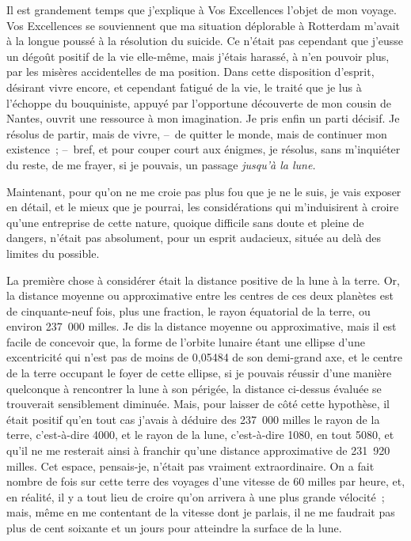 \documentclass[french,twoside]{book} %
\begin{document}
Il est grandement temps que j’explique à Vos Excellences l’objet de mon voyage. Vos Excellences se souviennent que ma situation déplorable à Rotterdam m’avait à la longue poussé à la résolution du suicide. Ce n’était pas cependant que j’eusse un dégoût positif de la vie elle-même, mais j’étais harassé, à n’en pouvoir plus, par les misères accidentelles de ma position. Dans cette disposition d’esprit, désirant vivre encore, et cependant fatigué de la vie, le traité que je lus à l’échoppe du bouquiniste, appuyé par l’opportune découverte de mon cousin de Nantes, ouvrit une ressource à mon imagination. Je pris enfin un parti décisif. Je résolus de partir, mais de vivre, – de quitter le monde, mais de continuer mon existence ; – bref, et pour couper court aux énigmes, je résolus, sans m’inquiéter du reste, de me frayer, si je pouvais, un passage \emph{jusqu’à la lune.}\par
Maintenant, pour qu’on ne me croie pas plus fou que je ne le suis, je vais exposer en détail, et le mieux que je pourrai, les considérations qui m’induisirent à croire qu’une entreprise de cette nature, quoique difficile sans doute et pleine de dangers, n’était pas absolument, pour un esprit audacieux, située au delà des limites du possible.\par
La première chose à considérer était la distance positive de la lune à la terre. Or, la distance moyenne ou approximative entre les centres de ces deux planètes est de cinquante-neuf fois, plus une fraction, le rayon équatorial de la terre, ou environ 237 000 milles. Je dis la distance moyenne ou approximative, mais il est facile de concevoir que, la forme de l’orbite lunaire étant une ellipse d’une excentricité qui n’est pas de moins de 0,05484 de son demi-grand axe, et le centre de la terre occupant le foyer de cette ellipse, si je pouvais réussir d’une manière quelconque à rencontrer la lune à son périgée, la distance ci-dessus évaluée se trouverait sensiblement diminuée. Mais, pour laisser de côté cette hypothèse, il était positif qu’en tout cas j’avais à déduire des 237 000 milles le rayon de la terre, c’est-à-dire 4000, et le rayon de la lune, c’est-à-dire 1080, en tout 5080, et qu’il ne me resterait ainsi à franchir qu’une distance approximative de 231 920 milles. Cet espace, pensais-je, n’était pas vraiment extraordinaire. On a fait nombre de fois sur cette terre des voyages d’une vitesse de 60 milles par heure, et, en réalité, il y a tout lieu de croire qu’on arrivera à une plus grande vélocité ; mais, même en me contentant de la vitesse dont je parlais, il ne me faudrait pas plus de cent soixante et un jours pour atteindre la surface de la lune.\par
\end{document}
